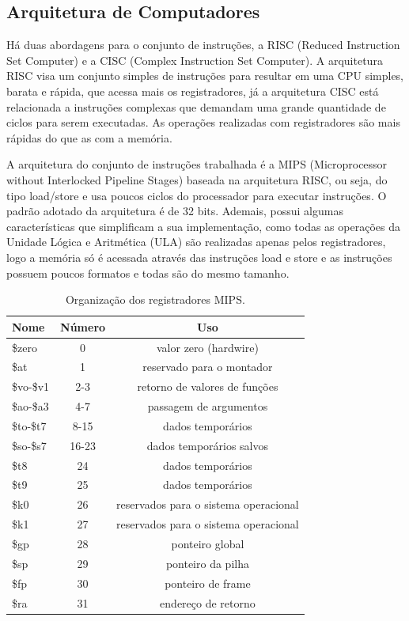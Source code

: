 \documentclass[10pt,twocolumn,letterpaper]{article}
\begin{document}
\subsection{Arquitetura de Computadores}

Há duas abordagens para o conjunto de instruções, a RISC (Reduced Instruction
Set Computer) e a CISC (Complex Instruction Set Computer). A arquitetura RISC
visa um conjunto simples de instruções para resultar em uma CPU simples, barata
e rápida, que acessa mais os registradores, já a arquitetura CISC está relacionada a instruções complexas que demandam uma grande quantidade de ciclos para serem executadas.
As operações realizadas com registradores são mais rápidas do que as com a memória.

A arquitetura do conjunto de instruções trabalhada é a MIPS (Microprocessor without Interlocked Pipeline Stages) baseada na arquitetura RISC, ou seja, do tipo load/store e usa poucos ciclos do processador para executar instruções. O padrão adotado da arquitetura é de 32 bits. Ademais, possui algumas características que simplificam a sua implementação, como todas as operações da Unidade Lógica e Aritmética (ULA) são realizadas apenas pelos registradores, logo a memória só é acessada através das instruções load e store e as instruções possuem poucos formatos e todas são do mesmo tamanho.

\begin{table}[h]
\renewcommand{\tablename}{Tabela}
\begin{center}
\begin{tabular}{|l|c||c|}
\hline
Nome & Número & Uso \\
\hline\hline
\$zero & 0 & valor zero (hardwire)\\
\$at & 1 & reservado para o montador\\
\$vo-\$v1 & 2-3 & retorno de valores de funções\\
\$ao-\$a3 & 4-7 & passagem de argumentos\\
\$to-\$t7 & 8-15 & dados temporários\\
\$so-\$s7 & 16-23 & dados temporários salvos\\
\$t8 & 24 & dados temporários\\
\$t9 & 25 & dados temporários\\
\$k0 & 26 & reservados para o sistema operacional\\
\$k1 & 27 & reservados para o sistema operacional\\
\$gp & 28 & ponteiro global\\
\$sp & 29 & ponteiro da pilha\\
\$fp & 30 & ponteiro de frame\\
\$ra & 31 & endereço de retorno\\
\hline
\end{tabular}
\end{center}
\caption{Organização dos registradores MIPS.}
\end{table}
\end{document}
